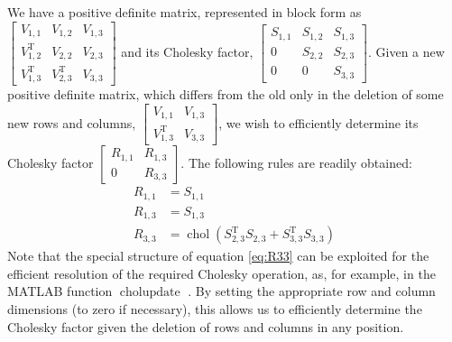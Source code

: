 \documentclass{acmtrans2m}
\newcommand{\tr}{\mathrm{T}}
\DeclareMathOperator{\chol}{chol}
\begin{document}
\noindent We have a positive definite matrix, represented in block form as $\begin{bmatrix} V_{1,1} & V_{1,2} & V_{1,3} \\ V^\tr_{1,2} & V_{2,2} & V_{2,3} \\ V^\tr_{1,3} & V^\tr_{2,3} & V_{3,3} \end{bmatrix}
$ and its Cholesky factor, $
\begin{bmatrix} S_{1,1} & S_{1,2} & S_{1,3} \\ 0 & S_{2,2} & S_{2,3} \\ 0 & 0 & S_{3,3} \end{bmatrix}
$. Given a new positive definite matrix, which differs from the old only in the deletion of some new rows and columns, $\begin{bmatrix} V_{1,1} & V_{1,3} \\ V^\tr_{1,3} & V_{3,3} \end{bmatrix}$, we wish to efficiently determine its Cholesky factor $\begin{bmatrix} R_{1,1} & R_{1,3} \\ 0 & R_{3,3} \end{bmatrix}$. The following rules are readily obtained:
\begin{align}
 R_{1,1}&=S_{1,1}\\
R_{1,3} &=S_{1,3}\\
R_{3,3}&=\chol(S^\tr_{2,3}S_{2,3}+S^\tr_{3,3}S_{3,3}) \label{eq:R33}
\end{align}
Note that the special structure of equation \eqref{eq:R33} can be exploited for the efficient resolution of the required Cholesky operation, as, for example, in the MATLAB  function $\operatorname{cholupdate}$  \cite{Matlab}. By setting the appropriate row and column dimensions (to zero if necessary), this allows us to efficiently determine the Cholesky factor given the deletion of rows and columns in any position. 
\end{document}
